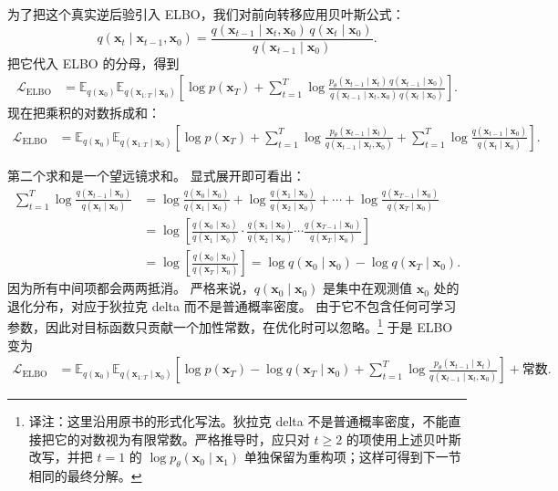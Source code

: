 为了把这个真实逆后验引入 ELBO，我们对前向转移应用贝叶斯公式：
\[
q(\mathbf{x}_t\mid \mathbf{x}_{t-1},\mathbf{x}_0)
=
\frac{
q(\mathbf{x}_{t-1}\mid \mathbf{x}_t,\mathbf{x}_0)\,
q(\mathbf{x}_t\mid \mathbf{x}_0)
}{
q(\mathbf{x}_{t-1}\mid \mathbf{x}_0)
}.
\]
把它代入 ELBO 的分母，得到
\[
\begin{aligned}
\mathcal{L}_{\mathrm{ELBO}}
&=
\mathbb{E}_{q(\mathbf{x}_0)}
\mathbb{E}_{q(\mathbf{x}_{1:T}\mid \mathbf{x}_0)}
\!\left[
\log p(\mathbf{x}_T)
+
\sum_{t=1}^{T}
\log
\frac{
p_\theta(\mathbf{x}_{t-1}\mid \mathbf{x}_t)\,
q(\mathbf{x}_{t-1}\mid \mathbf{x}_0)
}{
q(\mathbf{x}_{t-1}\mid \mathbf{x}_t,\mathbf{x}_0)\,
q(\mathbf{x}_t\mid \mathbf{x}_0)
}
\right].
\end{aligned}
\]
现在把乘积的对数拆成和：
\[
\begin{aligned}
\mathcal{L}_{\mathrm{ELBO}}
&=
\mathbb{E}_{q(\mathbf{x}_0)}
\mathbb{E}_{q(\mathbf{x}_{1:T}\mid \mathbf{x}_0)}
\!\left[
\log p(\mathbf{x}_T)
+
\sum_{t=1}^{T}
\log
\frac{
p_\theta(\mathbf{x}_{t-1}\mid \mathbf{x}_t)
}{
q(\mathbf{x}_{t-1}\mid \mathbf{x}_t,\mathbf{x}_0)
}
+
\sum_{t=1}^{T}
\log
\frac{
q(\mathbf{x}_{t-1}\mid \mathbf{x}_0)
}{
q(\mathbf{x}_t\mid \mathbf{x}_0)
}
\right].
\end{aligned}
\]

第二个求和是一个望远镜求和。
显式展开即可看出：
\[
\begin{aligned}
\sum_{t=1}^{T}
\log
\frac{
q(\mathbf{x}_{t-1}\mid \mathbf{x}_0)
}{
q(\mathbf{x}_t\mid \mathbf{x}_0)
}
&=
\log
\frac{q(\mathbf{x}_0\mid \mathbf{x}_0)}{q(\mathbf{x}_1\mid \mathbf{x}_0)}
+
\log
\frac{q(\mathbf{x}_1\mid \mathbf{x}_0)}{q(\mathbf{x}_2\mid \mathbf{x}_0)}
+\cdots+
\log
\frac{q(\mathbf{x}_{T-1}\mid \mathbf{x}_0)}{q(\mathbf{x}_T\mid \mathbf{x}_0)}
\\[6pt]
&=
\log\!\left[
\frac{q(\mathbf{x}_0\mid \mathbf{x}_0)}{q(\mathbf{x}_1\mid \mathbf{x}_0)}
\cdot
\frac{q(\mathbf{x}_1\mid \mathbf{x}_0)}{q(\mathbf{x}_2\mid \mathbf{x}_0)}
\cdots
\frac{q(\mathbf{x}_{T-1}\mid \mathbf{x}_0)}{q(\mathbf{x}_T\mid \mathbf{x}_0)}
\right]
\\[6pt]
&=
\log\!\left[
\frac{q(\mathbf{x}_0\mid \mathbf{x}_0)}{q(\mathbf{x}_T\mid \mathbf{x}_0)}
\right] =
\log q(\mathbf{x}_0\mid \mathbf{x}_0)
-\log q(\mathbf{x}_T\mid \mathbf{x}_0).
\end{aligned}
\]
因为所有中间项都会两两抵消。
严格来说，$q(\mathbf{x}_0\mid \mathbf{x}_0)$ 是集中在观测值 $\mathbf{x}_0$ 处的退化分布，对应于狄拉克 delta 而不是普通概率密度。
由于它不包含任何可学习参数，因此对目标函数只贡献一个加性常数，在优化时可以忽略。\footnote{译注：这里沿用原书的形式化写法。狄拉克 delta 不是普通概率密度，不能直接把它的对数视为有限常数。严格推导时，应只对 \(t\ge2\) 的项使用上述贝叶斯改写，并把 \(t=1\) 的 \(\log p_\theta(\mathbf{x}_0\mid\mathbf{x}_1)\) 单独保留为重构项；这样可得到下一节相同的最终分解。}
于是 ELBO 变为
\[
\begin{aligned}
\mathcal{L}_{\mathrm{ELBO}}
&=
\mathbb{E}_{q(\mathbf{x}_0)}
\mathbb{E}_{q(\mathbf{x}_{1:T}\mid \mathbf{x}_0)}
\!\left[
\log p(\mathbf{x}_T)
-
\log q(\mathbf{x}_T\mid \mathbf{x}_0)
+
\sum_{t=1}^{T}
\log
\frac{
p_\theta(\mathbf{x}_{t-1}\mid \mathbf{x}_t)
}{
q(\mathbf{x}_{t-1}\mid \mathbf{x}_t,\mathbf{x}_0)
}
\right]
+\text{常数}.
\end{aligned}
\]

